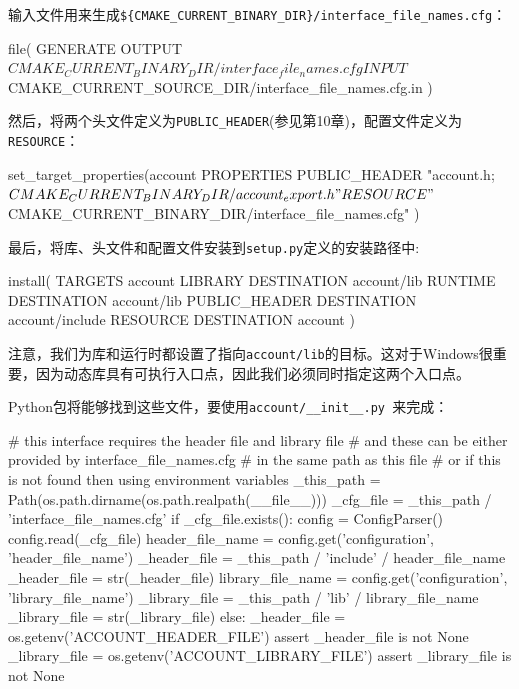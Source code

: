 输入文件用来生成\texttt{\$\{CMAKE\_CURRENT\_BINARY\_DIR\}/interface\_file\_names.cfg}：

\begin{codebox}[cmake]
file(
  GENERATE OUTPUT ${CMAKE_CURRENT_BINARY_DIR}/interface_file_names.cfg
  INPUT ${CMAKE_CURRENT_SOURCE_DIR}/interface_file_names.cfg.in
  )
\end{codebox}

然后，将两个头文件定义为\texttt{PUBLIC\_HEADER}(参见第10章)，配置文件定义为\texttt{RESOURCE}：

\begin{codebox}[cmake]
set_target_properties(account
  PROPERTIES
    PUBLIC_HEADER "account.h;${CMAKE_CURRENT_BINARY_DIR}/account_export.h"
    RESOURCE "${CMAKE_CURRENT_BINARY_DIR}/interface_file_names.cfg"
)
\end{codebox}

最后，将库、头文件和配置文件安装到\texttt{setup.py}定义的安装路径中:

\begin{codebox}[cmake]
install(
  TARGETS
    account
  LIBRARY
    DESTINATION account/lib
  RUNTIME
    DESTINATION account/lib
  PUBLIC_HEADER
    DESTINATION account/include
  RESOURCE
    DESTINATION account
  )
\end{codebox}

注意，我们为库和运行时都设置了指向\texttt{account/lib}的目标。这对于Windows很重要，因为动态库具有可执行入口点，因此我们必须同时指定这两个入口点。

Python包将能够找到这些文件，要使用\texttt{account/\_\_init\_\_.py }来完成：

\begin{codebox}[python]
# this interface requires the header file and library file
# and these can be either provided by interface_file_names.cfg
# in the same path as this file
# or if this is not found then using environment variables
_this_path = Path(os.path.dirname(os.path.realpath(__file__)))
_cfg_file = _this_path / 'interface_file_names.cfg'
if _cfg_file.exists():
  config = ConfigParser()
  config.read(_cfg_file)
  header_file_name = config.get('configuration', 'header_file_name')
  _header_file = _this_path / 'include' / header_file_name
  _header_file = str(_header_file)
  library_file_name = config.get('configuration', 'library_file_name')
  _library_file = _this_path / 'lib' / library_file_name
  _library_file = str(_library_file)
else:
  _header_file = os.getenv('ACCOUNT_HEADER_FILE')
  assert _header_file is not None
  _library_file = os.getenv('ACCOUNT_LIBRARY_FILE')
  assert _library_file is not None
\end{codebox}

